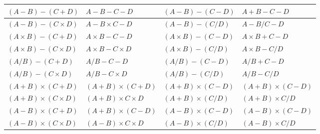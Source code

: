 \documentclass[11pt]{article}
\begin{document}
\begin{table}[htbp]
{\begin{tabular}{|l|l|l|l|}
$(A-B)-(C+D)$ & $A-B-C-D$ & $(A-B)-(C-D)$ & $A+B-C-D$  \\ \hline
$(A-B)-(C \times D)$ & $A-B \times C-D$ & $(A-B)-(C/D)$ & $A-B/C-D$  \\ \hline
$(A \times B)-(C+D)$ & $A \times B-C-D$ & $(A \times B)-(C-D)$ & $A \times B+C-D$  \\ \hline
$(A \times B)-(C \times D)$ & $A \times B-C \times D$ & $(A \times B)-(C/D)$ & $A \times B-C/D$  \\ \hline
$(A/B)-(C+D)$ & $A/B-C-D$ & $(A/B)-(C-D)$ & $A/B+C-D$  \\ \hline
$(A/B)-(C \times D)$ & $A/B-C \times D$ & $(A/B)-(C/D)$ & $A/B-C/D$  \\ \hline
$(A+B) \times (C+D)$ & $(A+B) \times (C+D)$ & $(A+B) \times (C-D)$ & $(A+B) \times (C-D)$  \\ \hline
$(A+B) \times (C \times D)$ & $(A+B) \times C \times D$ & $(A+B) \times (C/D)$ & $(A+B) \times C/D$  \\ \hline
$(A-B) \times (C+D)$ & $(A+B) \times (C-D)$ & $(A-B) \times (C-D)$ & $(A-B) \times (C-D)$  \\ \hline
$(A-B) \times (C \times D)$ & $(A-B) \times C \times D$ & $(A-B) \times (C/D)$ & $(A-B) \times C/D$  \\ \bottomrule
\end{tabular}
}
\end{table}
\end{document}
